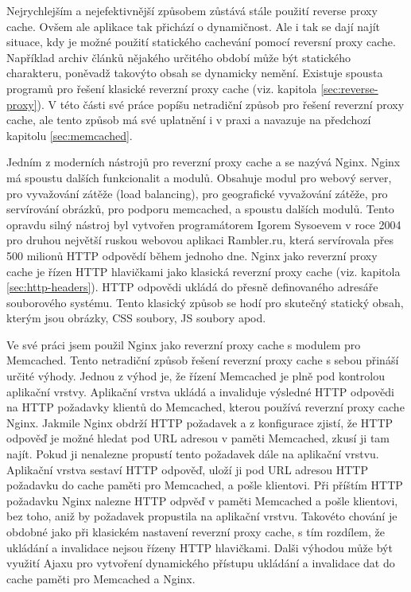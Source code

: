 \documentclass[12pt]{article}
\begin{document}
\clearpage

\obrazek
{}


Nejrychlejším a nejefektivnější způsobem zůstává stále použití reverse proxy cache. Ovšem ale aplikace tak přichází o dynamičnost. Ale i tak se dají najít situace, kdy je možné použití statického cachevání pomocí reversní proxy cache. Například archiv článků nějakého určitého období může být statického charakteru, poněvadž takovýto obsah se dynamicky nemění. Existuje spousta programů pro řešení klasické reverzní proxy cache (viz. kapitola \ref{sec:reverse-proxy}). V této části své práce popíšu netradiční způsob pro řešení reverzní proxy cache, ale tento způsob má své uplatnění i v praxi a navazuje na předchozí kapitolu \ref{sec:memcached}.

Jedním z moderních nástrojů pro reverzní proxy cache a se nazývá Nginx. Nginx má spoustu dalších funkcionalit a modulů. Obsahuje modul pro webový server, pro vyvažování zátěže (load balancing), pro geografické vyvažování zátěže, pro servírování obrázků, pro podporu memcached, a spoustu dalších modulů. Tento opravdu silný nástroj byl vytvořen programátorem Igorem Sysoevem v roce 2004 pro druhou největší ruskou webovou aplikaci Rambler.ru, která servírovala přes 500 milionů HTTP odpovědí během jednoho dne. Nginx jako reverzní proxy cache je řízen HTTP hlavičkami jako klasická reverzní proxy cache (viz. kapitola \ref{sec:http-headers}). HTTP odpovědi ukládá do přesně definovaného adresáře souborového systému. Tento klasický způsob se hodí pro skutečný statický obsah, kterým jsou obrázky, CSS soubory, JS soubory apod.\cite{nginx}

Ve své práci jsem použil Nginx jako reverzní proxy cache s modulem pro Memcached. Tento netradiční způsob řešení reverzní proxy cache s sebou přináší určité výhody. Jednou z výhod je, že řízení Memcached je plně pod kontrolou aplikační vrstvy. Aplikační vrstva ukládá a invaliduje výsledné HTTP odpovědi na HTTP požadavky klientů do Memcached, kterou používá reverzní proxy cache Nginx. Jakmile Nginx obdrží HTTP požadavek a z konfigurace zjistí, že HTTP odpověď je možné hledat pod URL adresou v paměti Memcached, zkusí ji tam najít. Pokud ji nenalezne propustí tento požadavek dále na aplikační vrstvu. Aplikační vrstva sestaví HTTP odpověď, uloží ji pod URL adresou HTTP požadavku do cache paměti pro Memcached, a pošle klientovi. Při příštím HTTP požadavku Nginx nalezne HTTP odpvěď v paměti Memcached a pošle klientovi, bez toho, aniž by požadavek propustila na aplikační vrstvu. Takovéto chování je obdobné jako při klasickém nastavení reverzní proxy cache, s tím rozdílem, že ukládání a invalidace nejsou řízeny HTTP hlavičkami. Dalši výhodou může být využití Ajaxu pro vytvoření dynamického přístupu ukládání a invalidace dat do cache paměti pro Memcached a Nginx.\cite{nginx-memcached}
\end{document}
